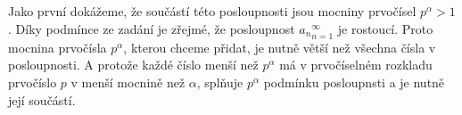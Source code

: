 \documentclass{fkssolpub}
\author{Ondřej Sedláček}
\begin{document}
 

Jako první dokážeme, že součástí této posloupnosti jsou mocniny
prvočísel $p^{\alpha} > 1$. Díky podmínce ze zadání je zřejmé, 
že posloupnost ${a_n}_{n=1}^{\infty}$ je rostoucí. Proto mocnina
prvočísla $p^{\alpha}$, kterou chceme přidat, je nutně větší než všechna
čísla v posloupnosti. A protože každé číslo menší než $p^{\alpha}$ má
v prvočíselném rozkladu prvočíslo $p$ v menší mocnině než $\alpha$, 
splňuje $p^{\alpha}$ podmínku posloupnsti a je nutně její součástí.
\end{document}
